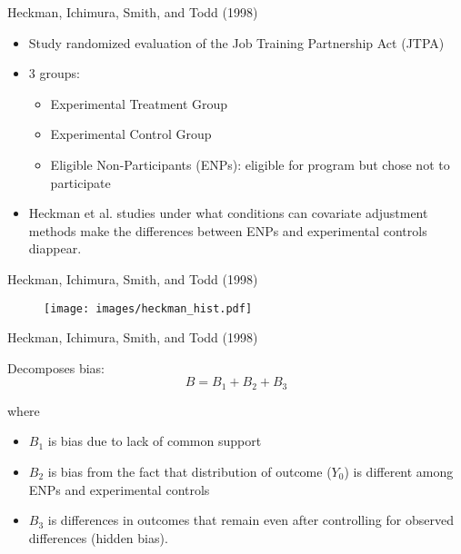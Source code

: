 \documentclass{beamer}
\numberwithin{equation}{section}
\begin{document}
\begin{frame}{Heckman, Ichimura, Smith, and Todd (1998)}

\begin{itemize}
\itemsep1pt\parskip0pt
\item
  Study randomized evaluation of the Job Training Partnership Act (JTPA)
\item
  3 groups:

  \begin{itemize}
  \itemsep1pt\parskip0pt
  \item
    Experimental Treatment Group
  \item
    Experimental Control Group
  \item
    Eligible Non-Participants (ENPs): eligible for program but chose not
    to participate
  \end{itemize}
\item
  Heckman et al. studies under what conditions can covariate adjustment
  methods make the differences between ENPs and experimental controls
  diappear.
\end{itemize}

\end{frame}

\begin{frame}{Heckman, Ichimura, Smith, and Todd (1998)}

\begin{figure}[ht] \centering
    \texttt{[image: images/heckman\_hist.pdf]}
\end{figure}

\end{frame}

\begin{frame}{Heckman, Ichimura, Smith, and Todd (1998)}

Decomposes bias: \[ B = B_1 + B_2 + B_3 \]

where

\begin{itemize}
\itemsep1pt\parskip0pt
\item
  $B_1$ is bias due to lack of common support \pause
\item
  $B_2$ is bias from the fact that distribution of outcome ($Y_0$) is
  different among ENPs and experimental controls \pause
\item
  $B_3$ is differences in outcomes that remain even after controlling
  for observed differences (\alert{hidden bias}).
\end{itemize}

\end{frame}
\end{document}
